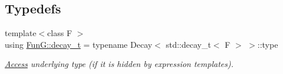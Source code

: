 \subsection*{Typedefs}
\begin{DoxyCompactItemize}
\item 
{\footnotesize template$<$class F $>$ }\\using \hyperlink{namespaceFunG_a195ac37d8696970c89b112c81a1e4d6e}{Fun\-G\-::decay\-\_\-t} = typename Decay$<$ std\-::decay\-\_\-t$<$ F $>$ $>$\-::type
\begin{DoxyCompactList}\small\item\em \hyperlink{namespaceFunG_1_1Access}{Access} underlying type (if it is hidden by expression templates). \end{DoxyCompactList}\end{DoxyCompactItemize}
